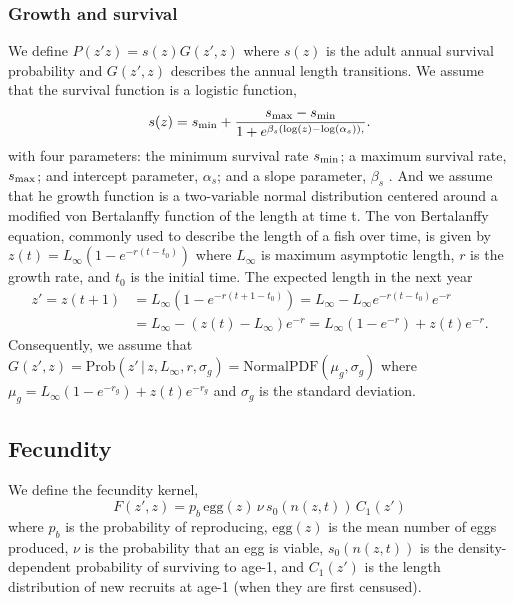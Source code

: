 \documentclass[11pt,oneside]{amsart}
\def\ds{\displaystyle}
\theoremstyle{definition}
\begin{document}
\subsubsection{Growth and survival}
We define $P(z'z) = s(z)G(z',z)$ where $s(z)$ is the adult annual survival probability and $G(z',z)$ describes the annual length transitions. We assume that the survival function is a logistic function,
\begin{equation}\label{eq:surv}
s(z) = s_{\rm min} + \frac{s_{\rm max}-s_{\rm min}}{1+e^{\beta_s(\log(z)-\log(\alpha_s)),}}.
\end{equation}
with four parameters: the minimum survival rate $s_{\rm min}$; a maximum survival rate, $s_{\rm max}$; and intercept parameter, $\alpha_{s}$; and a slope parameter, $\beta_{s}$ \citep{bolker2008ecological}. And we assume that he growth function is a two-variable normal distribution centered around a modified von Bertalanffy function of the length at time t.  The von Bertalanffy equation, commonly used to describe the length of a fish over time, is given by $\ds z(t) = L_{\infty} \left(1-e^{-r(t-t_0)} \right)$ where $L_\infty$ is maximum asymptotic length, $r$ is the growth rate, and $t_0$ is the initial time. The expected length in the next year
\begin{align*}
 z' =z(t+1) & =  L_{\infty} \left(1-e^{-r(t+1-t_0)} \right) =  L_{\infty} - L_{\infty}e^{-r(t-t_0)} e^{-r} \\
 & =   L_\infty - \left( z(t)-L_\infty \right) e^{-r} =   L_{\infty} \left(1-e^{-r} \right) + z(t)e^{-r}. 
 \end{align*}
Consequently, we assume that 
$\ds G(z',z) = \mathrm{Prob}(z' \, | \,  z, L_{\infty}, r, \sigma_g) = \mathrm{Normal PDF}(\mu_g, \sigma_g)$
where $\mu_g =  L_{\infty} \left(1-e^{-r_g} \right) + z(t)e^{-r_g}$ and $\sigma_g$ is the standard deviation.

\subsection{Fecundity}
We define the fecundity kernel, 
\begin{equation}\label{eq:fecundity}
F(z', z) = p_b \, \mbox{egg}(z) \, \nu \, s_0(n(z,t)) \, C_1(z')
\end{equation}
where $p_b$ is the probability of reproducing, $\mbox{egg}(z)$ is the mean number of eggs produced, $\nu$ is the probability that an egg is viable, $s_0(n(z,t))$ is the density-dependent probability of surviving to age-1, and $C_1 (z')$ is the length distribution of new recruits at age-1 (when they are first censused).
\end{document}
